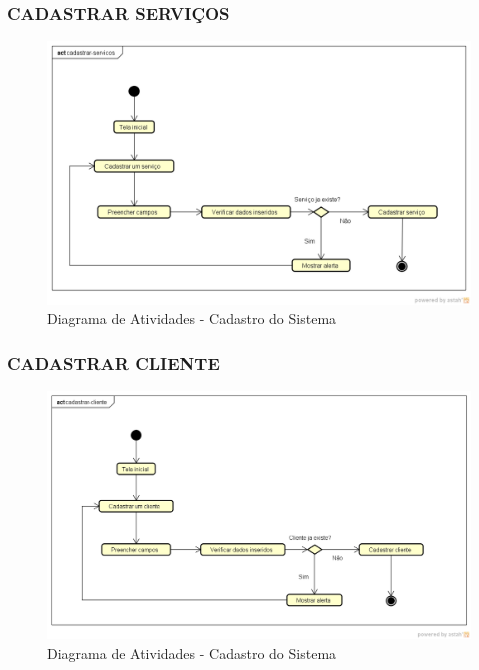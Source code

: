\subsubsection{CADASTRAR SERVIÇOS}
\begin{figure}[htb]
	\caption{\label{fig_cadastro} Diagrama de Atividades - Cadastro do Sistema}
	\begin{center}
	    \includegraphics[width=0.8\linewidth]{imagens/servicos.png}
	\end{center}
\end{figure}

\newpage
\subsubsection{CADASTRAR CLIENTE}
\begin{figure}[htb]
	\caption{\label{fig_cadastro} Diagrama de Atividades - Cadastro do Sistema}
	\begin{center}
	    \includegraphics[width=0.8\linewidth]{imagens/cliente.png}
	\end{center}
\end{figure}

